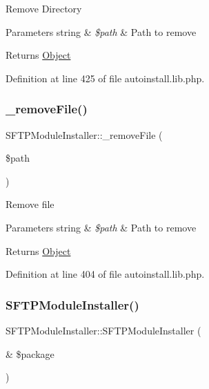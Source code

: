 Remove Directory


\begin{DoxyParams}[1]{Parameters}
string & {\em \$path} & Path to remove \\
\hline
\end{DoxyParams}
\begin{DoxyReturn}{Returns}
\hyperlink{classObject}{Object} 
\end{DoxyReturn}


Definition at line 425 of file autoinstall.\+lib.\+php.

\hypertarget{classSFTPModuleInstaller_abd1dd628941e99ee3ab526cf19cc7d54}{}\label{classSFTPModuleInstaller_abd1dd628941e99ee3ab526cf19cc7d54} 
\subsubsection{\texorpdfstring{\+\_\+remove\+File()}{\_removeFile()}}
{\footnotesize\ttfamily S\+F\+T\+P\+Module\+Installer\+::\+\_\+remove\+File (\begin{DoxyParamCaption}\item[{}]{\$path }\end{DoxyParamCaption})}

Remove file


\begin{DoxyParams}[1]{Parameters}
string & {\em \$path} & Path to remove \\
\hline
\end{DoxyParams}
\begin{DoxyReturn}{Returns}
\hyperlink{classObject}{Object} 
\end{DoxyReturn}


Definition at line 404 of file autoinstall.\+lib.\+php.

\hypertarget{classSFTPModuleInstaller_ae2ab80c52793052af4aeb66bc1b8910b}{}\label{classSFTPModuleInstaller_ae2ab80c52793052af4aeb66bc1b8910b} 
\subsubsection{\texorpdfstring{S\+F\+T\+P\+Module\+Installer()}{SFTPModuleInstaller()}}
{\footnotesize\ttfamily S\+F\+T\+P\+Module\+Installer\+::\+S\+F\+T\+P\+Module\+Installer (\begin{DoxyParamCaption}\item[{\&}]{\$package }\end{DoxyParamCaption})}

